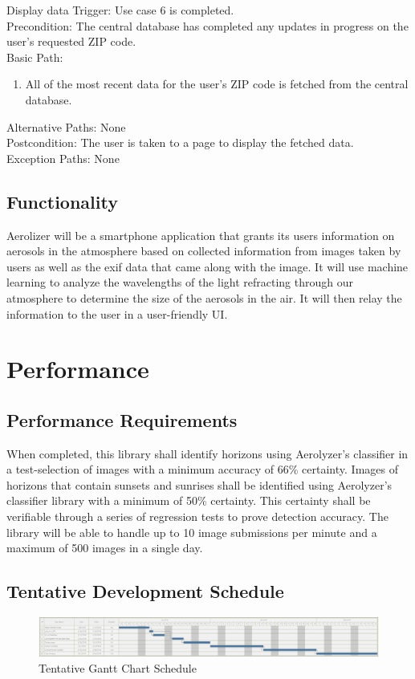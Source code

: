 \documentclass[journal,10pt,draftclsnofoot,onecolumn]{IEEEtran}
\makeatletter
\renewcommand\subsubsection{\@startsection{subsubsection}{3}{\z@}
                                     {-3.25ex\@plus -1ex \@minus -.2ex}
                                     {-1.5ex \@plus -.2ex}
                                     {\normalfont\normalsize\bfseries}}
\makeatother
\begin{document}
\begin{singlespace}
		\subsubsection{Display data}
			Trigger: Use case 6 is completed.\\
			Precondition: The central database has completed any updates in progress on the user's requested ZIP code.\\
			Basic Path:
			\begin{enumerate}
				\item All of the most recent data for the user's ZIP code is fetched from the central database.
			\end{enumerate}
			Alternative Paths: None\\
			Postcondition: The user is taken to a page to display the fetched data.\\
			Exception Paths: None

	\subsection{Functionality}
		Aerolizer will be a smartphone application that grants its users information on aerosols in the atmosphere based on collected information from images taken by users as well as the exif data that came along with the image.
		It will use machine learning to analyze the wavelengths of the light refracting through our atmosphere to determine the size of the aerosols in the air. It will then relay the information to the user in a user-friendly UI. 

\clearpage

\section{Performance}
	\subsection{Performance Requirements}
		When completed, this library shall identify horizons using Aerolyzer's classifier in a test-selection of images with a minimum accuracy of 66\% certainty.
		Images of horizons that contain sunsets and sunrises shall be identified using Aerolyzer's classifier library with a minimum of 50\% certainty.
		This certainty shall be verifiable through a series of regression tests to prove detection accuracy.
		The library will be able to handle up to 10 image submissions per minute and a maximum of 500 images in a single day.

	\begin{landscape}
		\section{Tentative Development Schedule}
		\begin{figure}[h]
			\includegraphics[width=9.5in]{gantt.png}
			\caption{Tentative Gantt Chart Schedule}
		    \label{fig:Tentative Schedule}
	    \end{figure}
	\end{landscape}

\end{singlespace}
\end{document}
